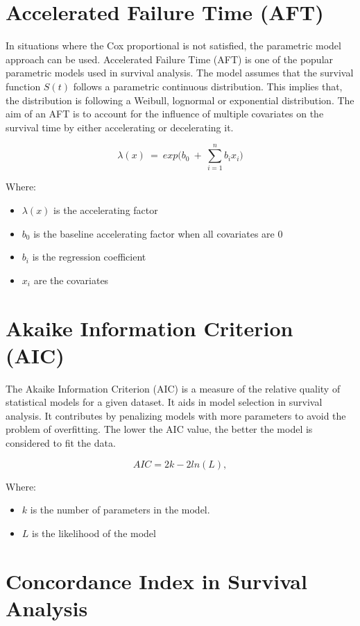 \documentclass[doublespacing]{report} %
\begin{document}
\section{Accelerated Failure Time (AFT)}

In situations where the Cox proportional is not satisfied, the parametric model approach can be used. Accelerated Failure Time (AFT) is one of the popular parametric models used in survival analysis. The model assumes that the survival function \(S(t)\) follows a parametric continuous distribution. This implies that, the distribution is following a Weibull, lognormal or exponential distribution. The aim of an AFT is to account for the influence of multiple covariates on the survival time by either accelerating or decelerating it.

\[\lambda(x)\ =\ exp(b_0\ +\ \sum_{i=1}^{n}{b_ix_i)}\]

Where:
 \begin{itemize}
     \item \(\lambda(x)\) is the accelerating factor
     \item \(b_0 \) is the baseline accelerating factor when all covariates are 0
     \item \(b_i\) is the regression coefficient
     \item \(x_i\) are the covariates

 \end{itemize}
 
\section{Akaike Information Criterion (AIC)}

The Akaike Information Criterion (AIC) is a measure of the relative quality of statistical models for a given dataset. It aids in model selection in survival analysis. It contributes by penalizing models with more parameters to avoid the problem of overfitting. The lower the AIC value, the better the model is considered to fit the data.

\[AIC=2k-2ln(L),\]

Where:
 \begin{itemize}
     \item \(k \) is the number of parameters in the model.
     \item \(L\) is the likelihood of the model
 \end{itemize}

\section{Concordance Index in Survival Analysis}
\end{document}
